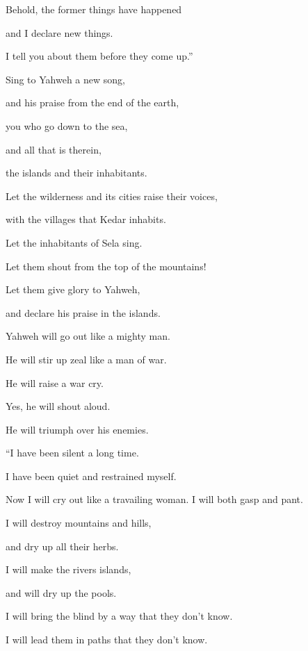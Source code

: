 {\par }{\Q {}Behold, the former things have happened
\par }{\QB and I declare new things.
\par }{\QB I tell you about them before they come up.”
\par }{\BB \par }{\Q {}Sing to Yahweh a new song,
\par }{\QB and his praise from the end of the earth,
\par }{\QB you who go down to the sea,
\par }{\QB and all that is therein,
\par }{\QB the islands and their inhabitants.
\par }{\Q {}Let the wilderness and its cities raise their voices,
\par }{\QB with the villages that Kedar inhabits.
\par }{\QB Let the inhabitants of Sela sing.
\par }{\QB Let them shout from the top of the mountains!
\par }{\Q {}Let them give glory to Yahweh,
\par }{\QB and declare his praise in the islands.
\par }{\Q {}Yahweh will go out like a mighty man.
\par }{\QB He will stir up zeal like a man of war.
\par }{\QB He will raise a war cry.
\par }{\QB Yes, he will shout aloud.
\par }{\QB He will triumph over his enemies.
\par }{\BB \par }{\Q {}“I have been silent a long time.
\par }{\QB I have been quiet and restrained myself.
\par }{\QB Now I will cry out like a travailing woman. I will both gasp and pant.
\par }{\Q {}I will destroy mountains and hills,
\par }{\QB and dry up all their herbs.
\par }{\QB I will make the rivers islands,
\par }{\QB and will dry up the pools.
\par }{\Q {}I will bring the blind by a way that they don’t know.
\par }{\QB I will lead them in paths that they don’t know.
}
